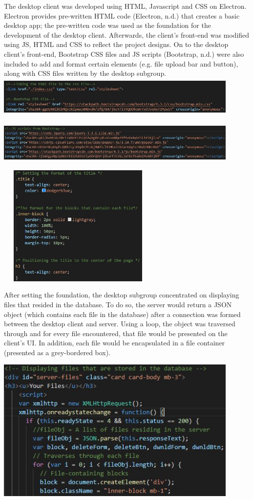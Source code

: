 \documentclass{article}
\begin{document}
The desktop client was developed using  HTML, Javascript and CSS on Electron. Electron provides pre-written HTML code (Electron, n.d.) that creates a basic desktop app; the pre-written code was used as the foundation for the development of the desktop client. Afterwards, the client's front-end was modified using JS, HTML and CSS to reflect the project designs. On to the desktop client's front-end, Bootstrap CSS files and JS scripts (Bootstrap, n.d.) were also included to add and format certain elements (e.g. file upload bar and button), along with CSS files written by the desktop subgroup.
\includegraphics[width=12cm, height=2cm]{BootstrapCSSfiles}

\includegraphics[width=12cm, height=2cm]{BootstrapJSscripts}

\includegraphics[width=8cm, height=6cm]{css}

After setting the foundation, the desktop subgroup concentrated on displaying files that resided in the database. To do so, the server would return a JSON object (which contains each file in the database) after a connection was formed between the desktop client and server. Using a loop, the object was traversed through and for every file encountered, that file would be presented on the client's UI. In addition, each file would be encapsulated in a file container (presented as a grey-bordered box).

\includegraphics[width=12cm]{display1}
\end{document}
